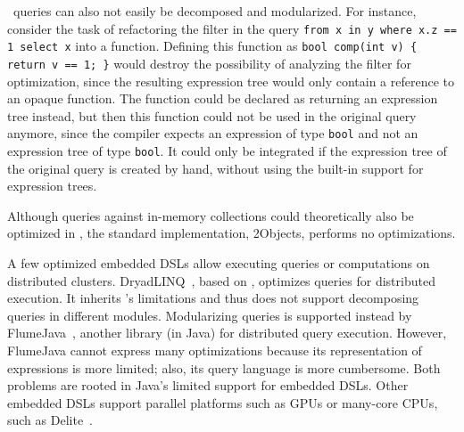 \LINQ\ queries can also not easily be decomposed and modularized. For instance, consider the task of refactoring the filter in the query {\tt from x in y where x.z == 1 select x}
into a function. Defining this function as {\tt bool comp(int v) \{ return v == 1; \}} would destroy the possibility of analyzing the filter for optimization, since
the resulting expression tree would only contain a reference to an opaque function. The function could be declared as returning an expression tree instead, but then
this function could not be used in the original query anymore, since the compiler expects an expression of type {\tt bool} and not an expression tree of type {\tt bool}.
It could only be integrated if the expression tree of the original query is created by hand, without using the built-in support for expression trees.



Although queries against in-memory collections could theoretically also be optimized in \LINQ, the standard implementation, {\LINQ}2Objects, performs no optimizations.

A few optimized embedded DSLs allow executing queries or computations on distributed clusters.
DryadLINQ~\citep{Yu08}, based on \LINQ, optimizes queries for distributed
execution. It inherits \LINQ's limitations and thus does not support decomposing queries in different modules.
Modularizing queries is supported instead by FlumeJava~\citep{Chambers10},
another library (in Java) for distributed query execution.
However, FlumeJava cannot express many optimizations because its representation
of expressions is more
limited; also, its query language is more cumbersome. Both problems are rooted
in Java's limited support for embedded DSLs.
Other embedded DSLs support parallel platforms such as GPUs or many-core CPUs,
such as Delite~\citep{Rompf13}.

